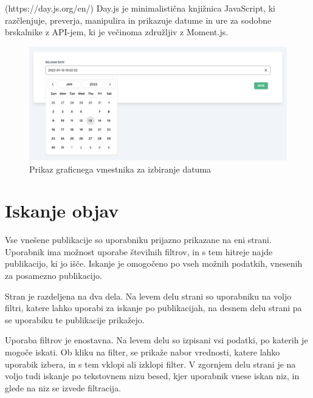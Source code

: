 \documentclass[a4paper, 12pt]{book}
\begin{document}
(https://day.js.org/en/)
Day.js je minimalistična knjižnica JavaScript, ki razčlenjuje, preverja, manipulira in prikazuje datume in ure za sodobne brskalnike z API-jem, ki je večinoma združljiv z Moment.js.
\begin{figure}[h]
\begin{center}
\includegraphics[width=1\textwidth]{slike/type_date.png}
\end{center}
\caption{ Prikaz graficnega vmestnika za izbiranje datuma }
\label{type-checkbox}
\end{figure}


\section{Iskanje objav}
\label{filters-page}
Vse vnešene publikacije so uporabniku prijazno prikazane na eni strani. Uporabnik ima možnost uporabe številnih filtrov, in s tem hitreje najde publikacijo, ki jo išče. Iskanje je omogočeno po vseh možnih podatkih, vnesenih za posamezno publikacijo. 

Stran je razdeljena na dva dela. Na levem delu strani so uporabniku na voljo filtri, katere lahko uporabi za iskanje po publikacijah, na desnem delu strani pa se uporabiku te publikacije prikažejo. 

Uporaba filtrov je enostavna. Na levem delu so izpisani vsi podatki, po katerih je mogoče iskati. Ob kliku na filter, se prikaže nabor vrednosti, katere lahko uporabik izbera, in s tem vklopi ali izklopi filter. V zgornjem delu strani je na voljo tudi iskanje po tekstovnem nizu besed, kjer uporabnik vnese iskan niz, in glede na niz se izvede filtracija.
\end{document}
